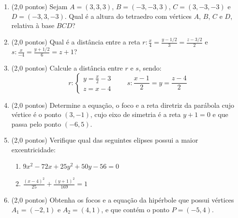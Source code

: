 \documentclass[12pt,a4paper]{article}
\begin{document}
\begin{enumerate}
\item (2,0 pontos) Sejam $A=(3,3,3)$, $B=(-3,-3,3)$, $C=(3,-3,-3)$ e $D=(-3,3,-3)$. Qual é a altura do tetraedro com vértices $A$, $B$, $C$ e $D$, relativa à base $BCD$?

\item (2,0 pontos) Qual é a distância entre a reta
$r: \frac{x}{4} = \frac{y-1/2}{3} = \frac{z-3/2}{2}$ e
$s: \frac{x}{-4} = \frac{y+1/2}{6} = z+1$?

\item (2,0 pontos) Calcule a distância entre $r$ e $s$, sendo:
\[
r: \begin{cases}
y = \frac{x}{2} - 3\\
z= x - 4 \qquad
\end{cases}
s: \frac{x-1}{2} = y = \frac{z-4}{2}
\]

\item (2,0 pontos) Determine a equação, o foco e a reta diretriz da parábola cujo vértice é o ponto $(3,-1)$, cujo eixo de simetria é a reta $y+1=0$ e que passa pelo ponto $(-6,5)$.

\item (2,0 pontos) Verifique qual das seguintes elipses possui a maior excentricidade:
\begin{multicols}{2}
\begin{enumerate}
\item $9 x^2-72 x+25 y^2+50 y-56 = 0$
\item $\frac{(x-4)^2}{25} + \frac{(y+1)^2}{169} = 1$
\end{enumerate}
\end{multicols}

\item (2,0 pontos) Obtenha os focos e a equação da hipérbole que possui vértices $A_1=(-2,1)$ e $A_2 = (4,1)$, e que contém o ponto $P = (-5,4)$.
\end{enumerate}
\end{document}
